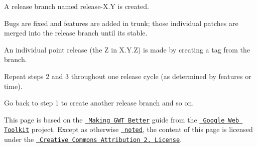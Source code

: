 \begin{DoxyEnumerate}
\item A release branch named {\ttfamily release-\/\+X.\+Y} is created.
\end{DoxyEnumerate}
\begin{DoxyEnumerate}
\item Bugs are fixed and features are added in trunk; those individual patches are merged into the release branch until it\textquotesingle{}s stable.
\end{DoxyEnumerate}
\begin{DoxyEnumerate}
\item An individual point release (the {\ttfamily Z} in {\ttfamily X.\+Y.\+Z}) is made by creating a tag from the branch.
\end{DoxyEnumerate}
\begin{DoxyEnumerate}
\item Repeat steps 2 and 3 throughout one release cycle (as determined by features or time).
\end{DoxyEnumerate}
\begin{DoxyEnumerate}
\item Go back to step 1 to create another release branch and so on.
\end{DoxyEnumerate}





This page is based on the \href{http://code.google.com/webtoolkit/makinggwtbetter.html}\texttt{ Making G\+WT Better} guide from the \href{http://code.google.com/webtoolkit/}\texttt{ Google Web Toolkit} project. Except as otherwise \href{http://code.google.com/policies.html#restrictions}\texttt{ noted}, the content of this page is licensed under the \href{http://creativecommons.org/licenses/by/2.5/}\texttt{ Creative Commons Attribution 2. License}. 